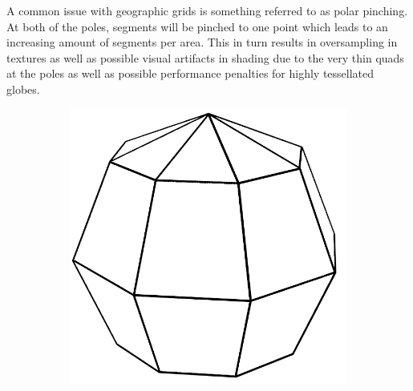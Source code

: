 A common issue with geographic grids is something referred to as polar pinching. At both of the poles, segments will be pinched to one point which leads to an increasing amount of segments per area. This in turn results in oversampling in textures as well as possible visual artifacts in shading due to the very thin quads at the poles as well as possible performance penalties for highly tessellated globes.

\begin{figure}
    \centering
    \begin{subfigure}[b]{0.2\textwidth}
        \includegraphics[width=\textwidth]{figures/tessellation/tessellation_geo1.png}
    \end{subfigure}
    ~ %
    \begin{subfigure}[b]{0.2\textwidth}

\end{subfigure}
\end{figure}
